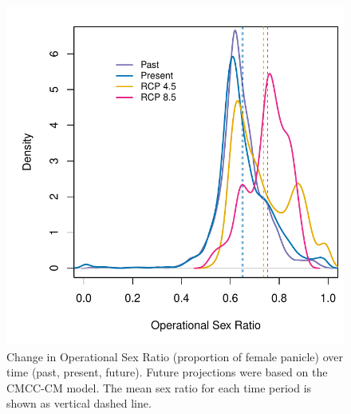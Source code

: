\documentclass[12pt]{article}\usepackage[]{graphicx}\usepackage[dvipsnames]{xcolor}
\begin{document}
\begin{figure}[H]
	\begin{center}
		\includegraphics[width=0.7\linewidth]{Figures/POAR_OSR.pdf}
		\caption{Change in Operational Sex Ratio (proportion of female panicle) over time (past, present, future).
			Future projections were based on the CMCC-CM model.
			The mean sex ratio for each time period is shown as vertical dashed line.}
		\label{fig:srprojcmc}
	\end{center}
\end{figure}
\end{document}
